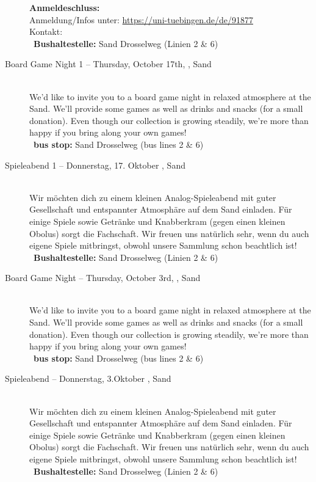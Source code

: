 \begin{description}
	\textbf{Anmeldeschluss:} \matheanmeldung\YEAR\\
	Anmeldung/Infos unter: \url{https://uni-tuebingen.de/de/91877}\\
	Kontakt: \texttt{\mathkontakt}\\
	\ifsommersemester
	~\textbf{Bushaltestelle:} Sand Drosselweg (Linien 2 \& 6) 
	\fi
\fi


 \ifml
 	\item[Board Game Night 1 -- Thursday, October 17th, \YEAR, Sand]~\\%
 	We'd like to invite you to a board game night in relaxed atmosphere at the Sand.
     We'll provide some games as well as drinks and snacks (for a small donation).
     Even though our collection is growing steadily, we're more than happy if you bring along your own games!\\
 	~\textbf{bus stop:} Sand Drosselweg (bus lines 2 \& 6)
 \else
     \item[Spieleabend 1 -- Donnerstag, 17. Oktober \YEAR, Sand]~\\%
 	Wir möchten dich zu einem kleinen Analog-Spieleabend mit guter Gesellschaft und entspannter Atmosphäre auf dem Sand einladen.
     Für einige Spiele sowie Getränke und Knabberkram (gegen einen kleinen Obolus) sorgt die Fachschaft.
     Wir freuen uns natürlich sehr, wenn du auch eigene Spiele mitbringst, obwohl unsere Sammlung schon beachtlich ist!\\
 	~\textbf{Bushaltestelle:} Sand Drosselweg (Linien 2 \& 6)
 \fi

\ifml
	\item[Board Game Night -- Thursday, October 3rd, \YEAR, Sand]~\\
	We'd like to invite you to a board game night in relaxed atmosphere at the Sand.
    We'll provide some games as well as drinks and snacks (for a small donation).
    Even though our collection is growing steadily, we're more than happy if you bring along your own games!\\
	~\textbf{bus stop:} Sand Drosselweg (bus lines 2 \& 6)
\else
    \item[Spieleabend -- Donnerstag, 3.Oktober \YEAR, Sand]~\\
	Wir möchten dich zu einem kleinen Analog-Spieleabend mit guter Gesellschaft und entspannter Atmosphäre auf dem Sand einladen.
    Für einige Spiele sowie Getränke und Knabberkram (gegen einen kleinen Obolus) sorgt die Fachschaft.
    Wir freuen uns natürlich sehr, wenn du auch eigene Spiele mitbringst, obwohl unsere Sammlung schon beachtlich ist!\\
	~\textbf{Bushaltestelle:} Sand Drosselweg (Linien 2 \& 6)
\fi


\end{description}
